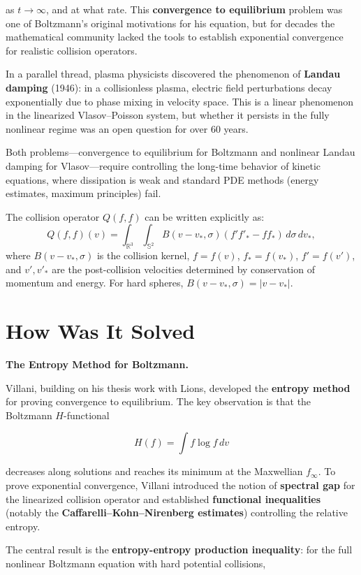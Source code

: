 as $t \to \infty$, and at what rate. This \textbf{convergence to equilibrium} problem was one of Boltzmann's original motivations for his equation, but for decades the mathematical community lacked the tools to establish exponential convergence for realistic collision operators.

In a parallel thread, plasma physicists discovered the phenomenon of \textbf{Landau damping} (1946): in a collisionless plasma, electric field perturbations decay exponentially due to phase mixing in velocity space. This is a linear phenomenon in the linearized Vlasov--Poisson system, but whether it persists in the fully nonlinear regime was an open question for over 60 years.

Both problems---convergence to equilibrium for Boltzmann and nonlinear Landau damping for Vlasov---require controlling the long-time behavior of kinetic equations, where dissipation is weak and standard PDE methods (energy estimates, maximum principles) fail.

The collision operator $Q(f,f)$ can be written explicitly as:
\[
Q(f,f)(v) = \int_{\mathbb{R}^3} \int_{\mathbb{S}^2} B(v-v_*, \sigma) \left( f' f'_* - f f_* \right) \, d\sigma \, dv_*,
\]
where $B(v-v_*, \sigma)$ is the collision kernel, $f = f(v)$, $f_* = f(v_*)$, $f' = f(v')$, and $v', v'_*$ are the post-collision velocities determined by conservation of momentum and energy. For hard spheres, $B(v-v_*, \sigma) = |v-v_*|$.

\section{How Was It Solved}\label{ch2010cedricvillani:how-was-it-solved}

\textbf{The Entropy Method for Boltzmann.}

Villani, building on his thesis work with Lions, developed the \textbf{entropy method} for proving convergence to equilibrium. The key observation is that the Boltzmann $H$-functional

\[
H(f) = \int f \log f \, dv
\]

decreases along solutions and reaches its minimum at the Maxwellian $f_\infty$. To prove exponential convergence, Villani introduced the notion of \textbf{spectral gap} for the linearized collision operator and established \textbf{functional inequalities} (notably the \textbf{Caffarelli--Kohn--Nirenberg estimates}) controlling the relative entropy.

The central result is the \textbf{entropy-entropy production inequality}: for the full nonlinear Boltzmann equation with hard potential collisions,

